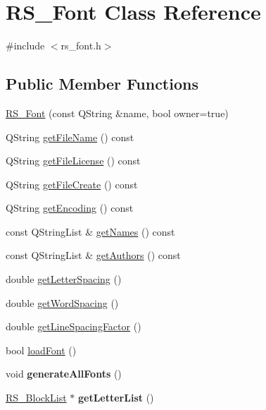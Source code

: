\hypertarget{classRS__Font}{\section{R\-S\-\_\-\-Font Class Reference}
\label{classRS__Font}
}


{\ttfamily \#include $<$rs\-\_\-font.\-h$>$}

\subsection*{Public Member Functions}
\begin{DoxyCompactItemize}
\item 
\hyperlink{classRS__Font_aff46ea0e78be06c9bb9728e755a5ddd1}{R\-S\-\_\-\-Font} (const Q\-String \&name, bool owner=true)
\item 
Q\-String \hyperlink{classRS__Font_a249c3298451eefa121b68b239ec695ba}{get\-File\-Name} () const 
\item 
Q\-String \hyperlink{classRS__Font_a5e4f47993b7a1b5af099d3671686d302}{get\-File\-License} () const 
\item 
Q\-String \hyperlink{classRS__Font_a819de67e29d4a4e121d04b2b3d70000e}{get\-File\-Create} () const 
\item 
Q\-String \hyperlink{classRS__Font_ac45503fbc02a68b23d0783f8e3d4dc43}{get\-Encoding} () const 
\item 
const Q\-String\-List \& \hyperlink{classRS__Font_af5bf1b6e5fb4ce6643d3e630519b8e7e}{get\-Names} () const 
\item 
const Q\-String\-List \& \hyperlink{classRS__Font_a7ad1106dd035106dee659a58c8aff6d9}{get\-Authors} () const 
\item 
double \hyperlink{classRS__Font_a101280aaa7f2d7d30bd631910a85a40d}{get\-Letter\-Spacing} ()
\item 
double \hyperlink{classRS__Font_a86f589fbeac95c4f7370ea07ba876bd2}{get\-Word\-Spacing} ()
\item 
double \hyperlink{classRS__Font_a0e3e99c40c6b1889359fa979ff548497}{get\-Line\-Spacing\-Factor} ()
\item 
bool \hyperlink{classRS__Font_a19899262b590c197b3f02d15b263071b}{load\-Font} ()
\item 
\hypertarget{classRS__Font_ad52b6a307e6f357f2398d09159ca3e21}{void {\bfseries generate\-All\-Fonts} ()}\label{classRS__Font_ad52b6a307e6f357f2398d09159ca3e21}

\item 
\hypertarget{classRS__Font_af501f043d8c7415ca4320f99d7b61dc3}{\hyperlink{classRS__BlockList}{R\-S\-\_\-\-Block\-List} $\ast$ {\bfseries get\-Letter\-List} ()}\label{classRS__Font_af501f043d8c7415ca4320f99d7b61dc3}


\end{DoxyCompactItemize}
